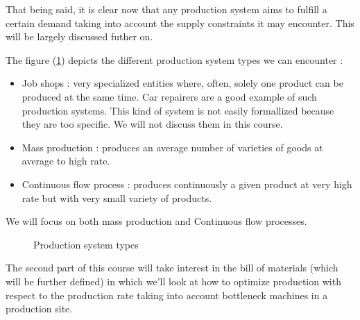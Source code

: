 That being said, it is clear now that any production system aims to fulfill a certain demand taking into account the supply constraints it may encounter. This will be largely discussed futher on.

The figure (\ref{intro:system-types}) depicts the different production system types we can encounter :
\begin{itemize}
    \item Job shops : very specialized entities where, often, solely one product can be produced at the same time. Car repairers are a good example of such production systems. This kind of system is not easily formallized because they are too specific. We will not discuss them in this course. 
    \item Mass production : produces an average number of varieties of goods at average to high rate.
    \item Continuous flow process : produces continuously a given product at very high rate but with very small variety of products.
\end{itemize}

We will focus on both mass production and Continuous flow processes.

\begin{figure}[h!]
    \centering
    \caption{\label{intro:system-types}Production system types}
\end{figure}

The second part of this course will take interest in the bill of materials (which will be further defined) in which we'll look at how to optimize production with respect to the production rate taking into account bottleneck machines in a production site. 